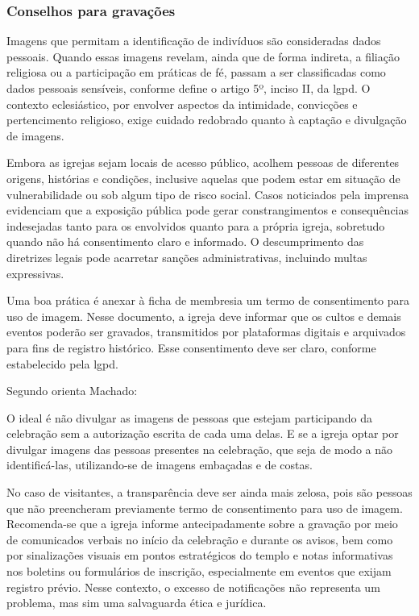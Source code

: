 \subsubsection{Conselhos para gravações}


Imagens que permitam a identificação de indivíduos são consideradas dados pessoais. Quando essas imagens revelam, ainda que de forma indireta, a filiação religiosa ou a participação em práticas de fé, passam a ser classificadas como dados pessoais sensíveis, conforme define o artigo 5º, inciso II, da \gls{lgpd}. O contexto eclesiástico, por envolver aspectos da intimidade, convicções e pertencimento religioso, exige cuidado redobrado quanto à captação e divulgação de imagens.

Embora as igrejas sejam locais de acesso público, acolhem pessoas de diferentes origens, histórias e condições, inclusive aquelas que podem estar em situação de vulnerabilidade ou sob algum tipo de risco social. Casos noticiados pela imprensa evidenciam que a exposição pública pode gerar constrangimentos e consequências indesejadas tanto para os envolvidos quanto para a própria igreja, sobretudo quando não há consentimento claro e informado\cite{silva2023}. O descumprimento das diretrizes legais pode acarretar sanções administrativas, incluindo multas expressivas.

Uma boa prática é anexar à ficha de membresia um termo de consentimento para uso de imagem. Nesse documento, a igreja deve informar que os cultos e demais eventos poderão ser gravados, transmitidos por plataformas digitais e arquivados para fins de registro histórico. Esse consentimento deve ser claro, conforme estabelecido pela \gls{lgpd}.

Segundo orienta Machado:

\begin{citacao}
    O ideal é não divulgar as imagens de pessoas que estejam participando da celebração sem a autorização escrita de cada uma delas. E se a igreja optar por divulgar imagens das pessoas presentes na celebração, que seja de modo a não identificá-las, utilizando-se de imagens embaçadas e de costas.\cite[p.~12]{machado2020}
\end{citacao}

No caso de visitantes, a transparência deve ser ainda mais zelosa, pois são pessoas que não preencheram previamente termo de consentimento para uso de imagem. Recomenda-se que a igreja informe antecipadamente sobre a gravação por meio de comunicados verbais no início da celebração e durante os avisos, bem como por sinalizações visuais em pontos estratégicos do templo e notas informativas nos boletins ou formulários de inscrição, especialmente em eventos que exijam registro prévio. Nesse contexto, o excesso de notificações não representa um problema, mas sim uma salvaguarda ética e jurídica.

